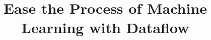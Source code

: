 \documentclass{sig-alternate-05-2015}
\begin{document}






%

\title{Ease the Process of Machine Learning with Dataflow}
%
%
%
%
%
\end{document}
